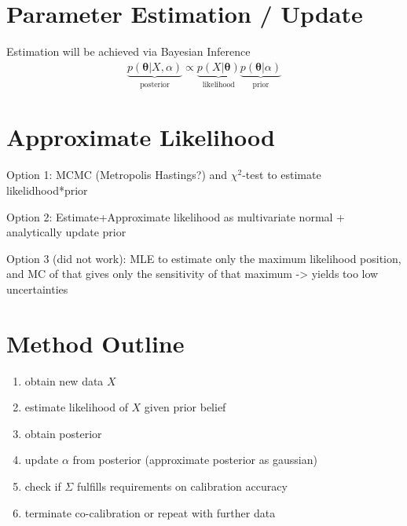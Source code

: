 \documentclass[10pt]{article}
\renewcommand{\vec}[1]{\boldsymbol{#1}}
\newcommand{\mat}[1]{#1}
\begin{document}
    \section{Parameter Estimation / Update}
    Estimation will be achieved via Bayesian Inference
    \begin{align}
        \underbrace{p(\vec{\theta} | X, \alpha)}_{\text{posterior}} \propto \underbrace{p(X | \vec{\theta})}_{\text{likelihood}} \underbrace{p(\vec{\theta} | \alpha)}_{\text{prior}}
    \end{align}
    
    \section{Approximate Likelihood}
    Option 1: MCMC (Metropolis Hastings?) and $\chi^2$-test to estimate likelidhood*prior
    
    Option 2: Estimate+Approximate likelihood as multivariate normal + analytically update prior
    
    Option 3 (did not work): MLE to estimate only the maximum likelihood position, and MC of that gives only the sensitivity of that maximum -> yields too low uncertainties
    
    \section{Method Outline}
    \begin{enumerate}
        \item obtain new data $X$
        \item estimate likelihood of $X$ given prior belief
        \item obtain posterior
        \item update $\alpha$ from posterior (approximate posterior as gaussian)
        \item check if $\mat{\Sigma}$ fulfills requirements on calibration accuracy
        \item terminate co-calibration or repeat with further data
    \end{enumerate}
    
\end{document}
